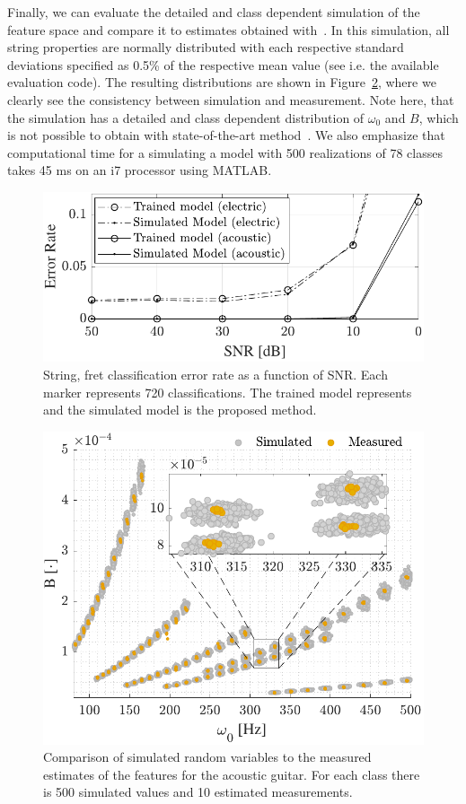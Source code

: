 Finally, we can evaluate the detailed and class dependent simulation of the feature space and compare it to estimates obtained with~\cite{hjerrild::icassp19}. In this simulation, all string properties are normally distributed with each respective standard deviations specified as 0.5\% of the respective mean value (see i.e. the available evaluation code). The resulting distributions are shown in Figure~\ref{fig:string_and_fret_model}, where we clearly see the consistency between simulation and measurement. Note here, that the simulation has a detailed and class dependent distribution of $\omega_0$ and $B$, which is not possible to obtain with state-of-the-art method~\cite{hjerrild::icassp19}. We also emphasize that computational time for a simulating a model with 500 realizations of 78 classes takes 45 ms on an i7 processor using MATLAB. %
%
\begin{figure}[t]
\centering
   \includegraphics[width=.85\linewidth]{img/SNRfig_both.pdf}\vspace{-2mm}
   \caption{String, fret classification error rate as a function of SNR. Each marker represents 720 classifications. The trained model represents~\cite{hjerrild::icassp19} and the simulated model is the proposed method.}
   \label{fig:string_fret_snr} 
\end{figure}
%
\begin{figure}[t]
\centering
   \includegraphics[width=.85\linewidth]{img/w0_vs_B2.pdf}\vspace{-2mm}
   \caption{Comparison of simulated random variables to the measured estimates of the features for the acoustic guitar. For each class there is 500 simulated values and 10 estimated measurements.}
   \label{fig:string_and_fret_model} 
\end{figure}
